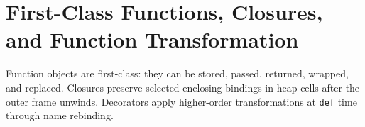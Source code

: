\section{First-Class Functions, Closures, and Function Transformation}

Function objects are first-class: they can be stored, passed, returned, wrapped, and replaced. Closures preserve selected enclosing bindings in heap cells after the outer frame unwinds. Decorators apply higher-order transformations at \texttt{def} time through name rebinding.
